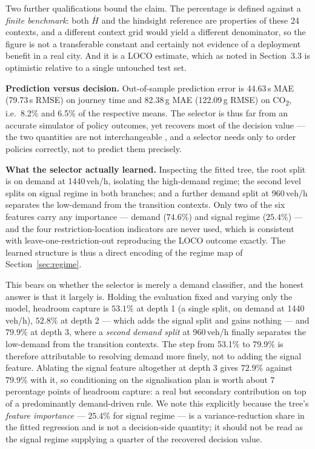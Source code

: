 \documentclass[10pt,a4paper]{article}
\newcommand{\CO}{CO\textsubscript{2}}
\begin{document}
Two further qualifications bound the claim. The percentage is defined against a \emph{finite benchmark}: both $\bar H$ and the hindsight reference are properties of these 24 contexts, and a different context grid would yield a different denominator, so the figure is not a transferable constant and certainly not evidence of a deployment benefit in a real city. And it is a LOCO estimate, which as noted in Section~3.3 is optimistic relative to a single untouched test set.

\textbf{Prediction versus decision.} Out-of-sample prediction error is 44.63\,s MAE (79.73\,s RMSE) on journey time and 82.38\,g MAE (122.09\,g RMSE) on \CO, i.e.\ 8.2\% and 6.5\% of the respective means. The selector is thus far from an accurate simulator of policy outcomes, yet recovers most of the decision value --- the two quantities are not interchangeable \cite{R11}, and a selector needs only to order policies correctly, not to predict them precisely.

\textbf{What the selector actually learned.} Inspecting the fitted tree, the root split is on demand at 1440\,veh/h, isolating the high-demand regime; the second level splits on signal regime in both branches; and a further demand split at 960\,veh/h separates the low-demand from the transition contexts. Only two of the six features carry any importance --- demand ($74.6\%$) and signal regime ($25.4\%$) --- and the four restriction-location indicators are never used, which is consistent with leave-one-restriction-out reproducing the LOCO outcome exactly. The learned structure is thus a direct encoding of the regime map of Section~\ref{sec:regime}.

This bears on whether the selector is merely a demand classifier, and the honest answer is that it largely is. Holding the evaluation fixed and varying only the model, headroom capture is $53.1\%$ at depth 1 (a single split, on demand at 1440\,veh/h), $52.8\%$ at depth 2 --- which adds the signal split and gains nothing --- and $79.9\%$ at depth 3, where a \emph{second demand split} at 960\,veh/h finally separates the low-demand from the transition contexts. The step from 53.1\% to 79.9\% is therefore attributable to resolving demand more finely, not to adding the signal feature. Ablating the signal feature altogether at depth 3 gives $72.9\%$ against $79.9\%$ with it, so conditioning on the signalisation plan is worth about $7$ percentage points of headroom capture: a real but secondary contribution on top of a predominantly demand-driven rule. We note this explicitly because the tree's \emph{feature importance} --- $25.4\%$ for signal regime --- is a variance-reduction share in the fitted regression and is not a decision-side quantity; it should not be read as the signal regime supplying a quarter of the recovered decision value.
\end{document}
